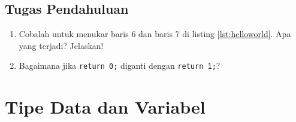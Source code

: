 \subsection{Tugas Pendahuluan}
\begin{enumerate}
	\item Cobalah untuk menukar baris 6 dan baris 7 di listing \ref{lst:helloworld}. Apa yang terjadi? Jelaskan!
	\item Bagaimana jika \verb|return 0;| diganti dengan \verb|return 1;|?
\end{enumerate}


\section{Tipe Data dan Variabel}
